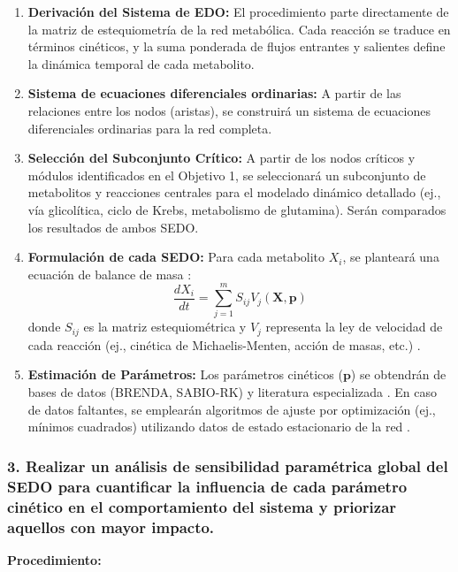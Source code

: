 \documentclass[12pt,spanish]{article}
\newcommand{\procedimiento}{\textbf{Procedimiento:}}
\begin{document}
	\begin{enumerate}
		\item \textbf{Derivación del Sistema de EDO:} El procedimiento parte directamente de la matriz de estequiometría de la red metabólica. Cada reacción se traduce en términos cinéticos, y la suma ponderada de flujos entrantes y salientes define la dinámica temporal de cada metabolito.
		
		\item \textbf{Sistema de ecuaciones diferenciales ordinarias:} A partir de las relaciones entre los nodos (aristas), se construirá un sistema de ecuaciones diferenciales ordinarias para la red completa.
		
		\item \textbf{Selección del Subconjunto Crítico:} A partir de los nodos críticos y módulos identificados en el Objetivo 1, se seleccionará un subconjunto de metabolitos y reacciones centrales para el modelado dinámico detallado (ej., vía glicolítica, ciclo de Krebs, metabolismo de glutamina). Serán comparados los resultados de ambos SEDO.
		
		\item \textbf{Formulación de cada SEDO:} Para cada metabolito $X_i$, se planteará una ecuación de balance de masa \cite{Liebermeister2010}:
		\[
		\frac{dX_i}{dt} = \sum_{j=1}^{m} S_{ij} V_j(\mathbf{X}, \mathbf{p})
		\]
		donde $S_{ij}$ es la matriz estequiométrica y $V_j$ representa la ley de velocidad de cada reacción (ej., cinética de Michaelis-Menten, acción de masas, etc.) \cite{Cornish2013}.
		
		\item \textbf{Estimación de Parámetros:} Los parámetros cinéticos ($\mathbf{p}$) se obtendrán de bases de datos (BRENDA, SABIO-RK) y literatura especializada \cite{chang2021, wittig2012}. En caso de datos faltantes, se emplearán algoritmos de ajuste por optimización (ej., mínimos cuadrados) utilizando datos de estado estacionario de la red \cite{stanford2013}.
	\end{enumerate}
	
	\subsubsection*{3. Realizar un análisis de sensibilidad paramétrica global del SEDO para cuantificar la influencia de cada parámetro cinético en el comportamiento del sistema y priorizar aquellos con mayor impacto.}
	
	\procedimiento
	
\end{document}
